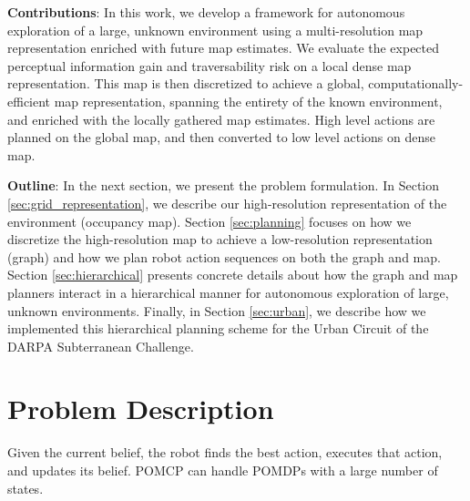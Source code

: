 \documentclass{article}
\newcommand{\ph}[1]{{\textbf{#1}:}} %
\begin{document}
\ph{Contributions}
In this work, we develop a framework for autonomous exploration of a large, unknown environment using a multi-resolution map representation enriched with future map estimates. We evaluate the expected perceptual information gain and traversability risk on a local dense map representation. This map is then discretized to achieve a global, computationally-efficient map representation, spanning the entirety of the known environment, and enriched with the locally gathered map estimates. High level actions are planned on the global map, and then converted to low level actions on dense map.    

\ph{Outline}
In the next section, we present the problem formulation. In Section \ref{sec:grid_representation}, we describe our high-resolution representation of the environment (occupancy map). Section \ref{sec:planning} focuses on how we discretize the high-resolution map to achieve a low-resolution representation (graph) and how we plan robot action sequences on both the graph and map. Section \ref{sec:hierarchical} presents concrete details about how the graph and map planners interact in a hierarchical manner for autonomous exploration of large, unknown environments. Finally, in Section \ref{sec:urban}, we describe how we implemented this hierarchical planning scheme for the Urban Circuit of the DARPA Subterranean Challenge.



\section{Problem Description}

Given the current belief, the robot finds the best action, executes that action, and updates its belief. POMCP can handle POMDPs with a large number of states.
\end{document}
